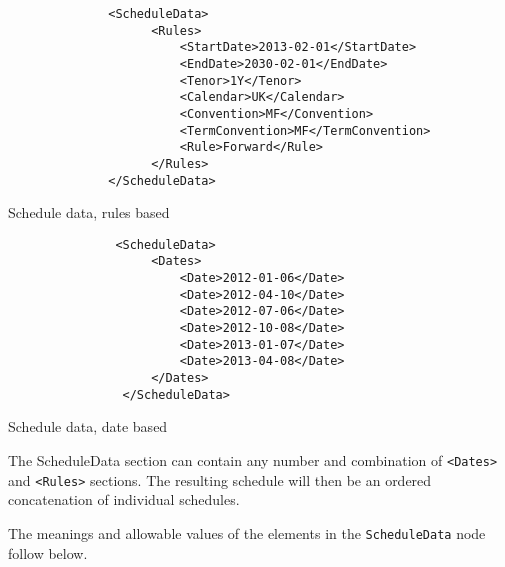 \begin{listing}[H]
\begin{verbatim}
              <ScheduleData>
                    <Rules>
                        <StartDate>2013-02-01</StartDate>
                        <EndDate>2030-02-01</EndDate>
                        <Tenor>1Y</Tenor>
                        <Calendar>UK</Calendar>
                        <Convention>MF</Convention>
                        <TermConvention>MF</TermConvention>
                        <Rule>Forward</Rule>
                    </Rules>
              </ScheduleData>
\end{verbatim}
\caption{Schedule data, rules based}
\label{lst:schedule_data_true}
\end{listing}

\begin{listing}[H]
\begin{verbatim}
               <ScheduleData>
                    <Dates>
                        <Date>2012-01-06</Date>
                        <Date>2012-04-10</Date>
                        <Date>2012-07-06</Date>
                        <Date>2012-10-08</Date>
                        <Date>2013-01-07</Date>
                        <Date>2013-04-08</Date>
                    </Dates>
                </ScheduleData>
\end{verbatim}
\caption{Schedule data, date based}
\label{lst:schedule_data_false}
\end{listing}

The ScheduleData section can contain any number and combination of
{\tt <Dates>} and {\tt <Rules>} sections. The resulting schedule will
then be an ordered concatenation of individual schedules.
 
\medskip
The meanings and allowable values of the elements in the \lstinline!ScheduleData! node follow below.

